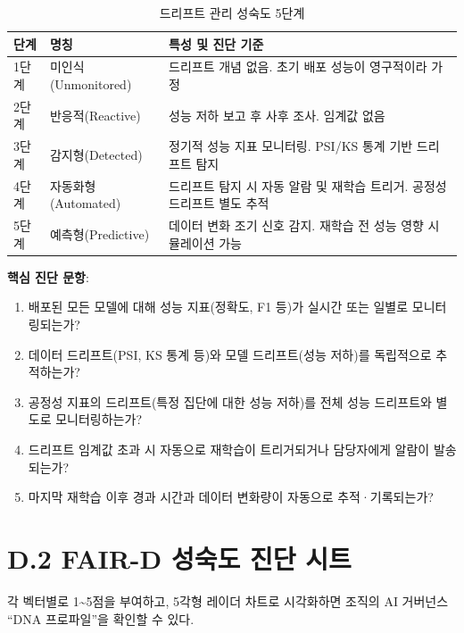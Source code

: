 \begin{table}[htbp]
\centering
\caption{드리프트 관리 성숙도 5단계}
\label{tab:drift_maturity}
\begin{tabularx}{\textwidth}{|l|l|X|}
\hline
\textbf{단계} & \textbf{명칭} & \textbf{특성 및 진단 기준} \\ \hline
1단계 & 미인식(Unmonitored) & 드리프트 개념 없음. 초기 배포 성능이 영구적이라 가정 \\ \hline
2단계 & 반응적(Reactive) & 성능 저하 보고 후 사후 조사. 임계값 없음 \\ \hline
3단계 & 감지형(Detected) & 정기적 성능 지표 모니터링. PSI/KS 통계 기반 드리프트 탐지 \\ \hline
4단계 & 자동화형(Automated) & 드리프트 탐지 시 자동 알람 및 재학습 트리거. 공정성 드리프트 별도 추적 \\ \hline
5단계 & 예측형(Predictive) & 데이터 변화 조기 신호 감지. 재학습 전 성능 영향 시뮬레이션 가능 \\ \hline
\end{tabularx}
\end{table}

\textbf{핵심 진단 문항}:
\begin{enumerate}
    \item 배포된 모든 모델에 대해 성능 지표(정확도, F1 등)가 실시간 또는 일별로 모니터링되는가?
    \item 데이터 드리프트(PSI, KS 통계 등)와 모델 드리프트(성능 저하)를 독립적으로 추적하는가?
    \item 공정성 지표의 드리프트(특정 집단에 대한 성능 저하)를 전체 성능 드리프트와 별도로 모니터링하는가?
    \item 드리프트 임계값 초과 시 자동으로 재학습이 트리거되거나 담당자에게 알람이 발송되는가?
    \item 마지막 재학습 이후 경과 시간과 데이터 변화량이 자동으로 추적·기록되는가?
\end{enumerate}

\section*{D.2 FAIR-D 성숙도 진단 시트}

각 벡터별로 1\textasciitilde{}5점을 부여하고, 5각형 레이더 차트로 시각화하면 조직의 AI 거버넌스 ``DNA 프로파일''을 확인할 수 있다.

